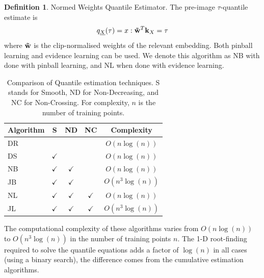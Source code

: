 \documentclass[twoside]{article} \usepackage{aistats2017}
\theoremstyle{definition}
\newtheorem{definition}{Definition}[section]
\theoremstyle{remark}
\newcommand{\rv}[1]{\underline{#1}}
\newcommand{\ds}[1]{{#1}}
\begin{document}
	\theoremstyle{definition}
	\begin{definition}{Normed Weights Quantile Estimator.}
		The pre-image $\tau$-quantile estimate is
		\begin{equation}
		q_{\rv{X}}(\tau) = x : \bvec{\tilde{w}}^{T} \bvec{k}_{\ds{X}} = \tau
		\end{equation}
		where $\mathbf{\tilde{w}}$ is the clip-normalised weights of the relevant embedding.
		Both pinball learning and evidence learning can be used. We denote this algorithm as NB with done with pinball learning, and NL when done with evidence learning.
	\end{definition}	
	
	\begin{table}[t!]
		\begin{center}
			\begin{tabular}{l|cccc}
				Algorithm & S & ND &   NC & Complexity \\ \hline
				DR  &              &                &                & $O(n \log(n))$    \\
				DS  & $\checkmark$ &                &                &
				$O(n \log(n))$  \\
				NB  & $\checkmark$ & $\checkmark$   &                &
				$O(n \log(n))$ \\
				JB  & $\checkmark$ & $\checkmark$   &                &
				$O(n^{3} \log(n))$ \\
				NL  & $\checkmark$ & $\checkmark$   & $\checkmark$   &
				$O(n \log(n))$ \\
				JL  & $\checkmark$ & $\checkmark$   & $\checkmark$   &   $O(n^{3} \log(n))$ 
			\end{tabular}
		\end{center}
		\caption{Comparison of Quantile estimation techniques. S stands for Smooth, ND for Non-Decreasing, and NC for Non-Crossing. For complexity, $n$ is the number of training points.}
		\label{table:quantile_regression_methods}
	\end{table}
	
		
	The computational complexity of these algorithms varies from $O(n \log(n))$ to $O(n^{3} \log(n))$ in the number of training points $n$. The 1-D root-finding required to solve the quantile equations adds a factor of $\log(n)$ in all cases (using a binary search), the difference comes from the cumulative estimation algorithms.
	
\end{document}
